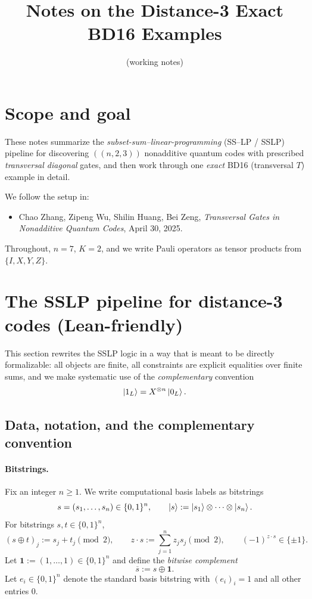 \documentclass[11pt]{article}
\title{Notes on the Distance-3 Exact BD16 Examples}
\author{(working notes)}
\date{}
\begin{document}
\maketitle

\section{Scope and goal}

These notes summarize the \emph{subset-sum--linear-programming} (SS--LP / SSLP) pipeline for discovering \(((n,2,3))\) nonadditive quantum codes with prescribed \emph{transversal diagonal} gates, and then work through one \emph{exact} BD16 (transversal \(T\)) example in detail.

We follow the setup in:
\begin{itemize}
\item Chao Zhang, Zipeng Wu, Shilin Huang, Bei Zeng, \emph{Transversal Gates in Nonadditive Quantum Codes}, April 30, 2025.
\end{itemize}

Throughout, \(n=7\), \(K=2\), and we write Pauli operators as tensor products from \(\{I,X,Y,Z\}\).

\section{The SSLP pipeline for distance-3 codes (Lean-friendly)}

This section rewrites the SSLP logic in a way that is meant to be directly formalizable:
all objects are finite, all constraints are explicit equalities over finite sums, and we
make systematic use of the \emph{complementary} convention
\[
\ket{1_L}=X^{\otimes n}\ket{0_L}.
\]

\subsection{Data, notation, and the complementary convention}

\paragraph{Bitstrings.}
Fix an integer \(n\ge 1\). We write computational basis labels as bitstrings
\[
s=(s_1,\dots,s_n)\in\{0,1\}^n,
\qquad
\ket{s}:=\ket{s_1}\otimes\cdots\otimes\ket{s_n}.
\]
For bitstrings \(s,t\in\{0,1\}^n\),
\[
(s\oplus t)_j := s_j+t_j\pmod 2,
\qquad
z\cdot s := \sum_{j=1}^n z_js_j\pmod 2,
\qquad
(-1)^{z\cdot s}\in\{\pm 1\}.
\]
Let \(\mathbf{1}:=(1,\dots,1)\in\{0,1\}^n\) and define the \emph{bitwise complement}
\[
\overline{s}:=s\oplus\mathbf{1}.
\]
Let \(e_i\in\{0,1\}^n\) denote the standard basis bitstring with \((e_i)_i=1\) and all other entries \(0\).
\end{document}
